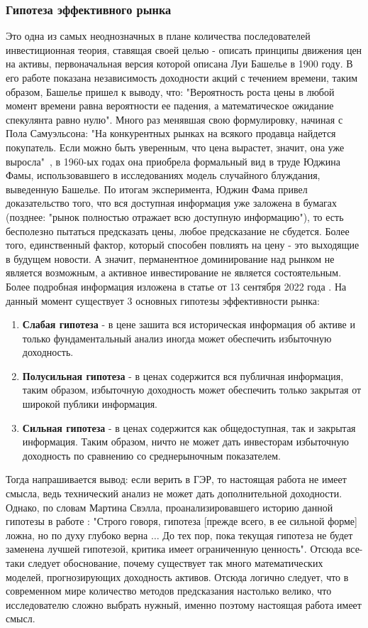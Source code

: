 		\subsubsection{Гипотеза эффективного рынка}
			Это одна из самых неоднозначных в плане количества последователей инвестиционная теория, ставящая своей целью - описать принципы движения цен на активы, первоначальная версия которой описана Луи Башелье в 1900 году. В его работе показана независимость доходности акций с течением времени, таким образом, Башелье пришел к выводу, что: "Вероятность роста цены в любой момент времени равна вероятности ее падения, а математическое ожидание спекулянта равно нулю". Много раз менявшая свою формулировку, начиная с Пола Самуэльсона: "На конкурентных рынках на всякого продавца найдется покупатель. Если можно быть уверенным, что цена вырастет, значит, она уже выросла"\ ,  в 1960-ых годах она приобрела формальный вид в труде Юджина Фамы, использовавшего в исследованиях модель случайного блуждания, выведенную Башелье. По итогам эксперимента, Юджин Фама привел доказательство того, что вся доступная информация уже заложена в бумагах (позднее: "рынок полностью отражает всю доступную информацию"), то есть бесполезно пытаться предсказать цены, любое предсказание не сбудется. Более того, единственный фактор, который способен повлиять на цену - это выходящие в будущем новости. А значит, перманентное доминирование над рынком не является возможным, а активное инвестирование не является состоятельным. Более подробная информация изложена в статье от 13 сентября 2022 года \cite{fama_market_efficiency}. На данный момент существует 3 основных гипотезы эффективности рынка:
			\begin{enumerate}
				\item \textbf{Слабая гипотеза} - в цене зашита вся историческая информация об активе и только фундаментальный анализ иногда может обеспечить избыточную доходность.
				\item \textbf{Полусильная гипотеза} - в ценах содержится вся публичная информация, таким образом, избыточную доходность может обеспечить только закрытая от широкой публики информация.
				\item \textbf{Сильная гипотеза} - в ценах содержится как общедоступная, так и закрытая информация. Таким образом, ничто не может дать инвесторам избыточную доходность по сравнению со среднерыночным показателем.
			\end{enumerate}
			Тогда напрашивается вывод: если верить в ГЭР, то настоящая работа не имеет смысла, ведь технический анализ не может дать дополнительной доходности. Однако, по словам Мартина Свэлла, проанализировавшего историю данной гипотезы в работе \cite{matrin_swell}: "Строго говоря, гипотеза [прежде всего, в ее сильной форме] ложна, но по духу глубоко верна $\ldots$ До тех пор, пока текущая гипотеза не будет заменена лучшей гипотезой, критика имеет ограниченную ценность". Отсюда все-таки следует обоснование, почему существует так много математических моделей, прогнозирующих доходность активов. Отсюда логично следует, что в современном мире количество методов предсказания настолько велико, что исследователю сложно выбрать нужный, именно поэтому настоящая работа имеет смысл.
